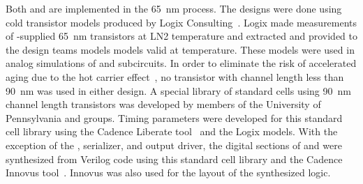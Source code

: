 Both  and  are implemented in the 
 \SI{65}{nm}  process. The designs were 
done using cold transistor models produced by Logix Consulting~\cite{Logix}.
Logix made measurements of -supplied  
\SI{65}{nm} transistors at LN2 temperature and extracted and provided 
to the design teams  models models valid at \lntwo 
temperature.  These models were used in analog simulations of 
 and  subcircuits.  In order to 
eliminate the risk of accelerated aging due to the hot carrier 
effect~\cite{Hot-electron}, no transistor with channel length 
less than \SI{90}{nm} was used in either  design.  
A special library of standard cells using \SI{90}{nm} channel 
length transistors was developed by members of the University 
of Pennsylvania and  groups. Timing parameters were 
developed for this standard cell library using the Cadence Liberate 
tool~\cite{Liberate} and the Logix  models. With the 
exception of the  , serializer, and 
output driver, the digital sections of  and 
 were synthesized from Verilog code using this 
standard cell library and the Cadence Innovus tool~\cite{Innovus}.
Innovus was also used for the layout of the synthesized logic.





\label{sec:fdsp-tpcelec-design-femb-alt-cryo}

